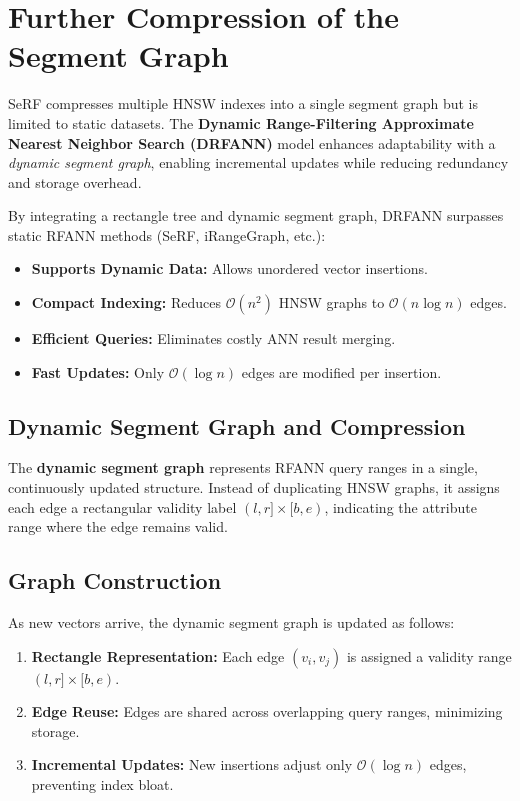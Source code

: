 \section{Further Compression of the Segment Graph}  
SeRF compresses multiple HNSW indexes into a single segment graph but is limited to static datasets. The \textbf{Dynamic Range-Filtering Approximate Nearest Neighbor Search (DRFANN)} model enhances adaptability with a \textit{dynamic segment graph}, enabling incremental updates while reducing redundancy and storage overhead.  

By integrating a rectangle tree and dynamic segment graph, DRFANN surpasses static RFANN methods (SeRF, iRangeGraph, etc.):  
\begin{itemize}  
    \item \textbf{Supports Dynamic Data:} Allows unordered vector insertions.  
    \item \textbf{Compact Indexing:} Reduces $\mathcal{O}(n^2)$ HNSW graphs to $\mathcal{O}(n \log n)$ edges.  
    \item \textbf{Efficient Queries:} Eliminates costly ANN result merging.  
    \item \textbf{Fast Updates:} Only $\mathcal{O}(\log n)$ edges are modified per insertion.  
\end{itemize}  

\subsection{Dynamic Segment Graph and Compression}  
The \textbf{dynamic segment graph} represents RFANN query ranges in a single, continuously updated structure. Instead of duplicating HNSW graphs, it assigns each edge a rectangular validity label $(l, r] \times [b, e)$, indicating the attribute range where the edge remains valid.  

\subsection{Graph Construction}  
As new vectors arrive, the dynamic segment graph is updated as follows:  
\begin{enumerate}  
    \item \textbf{Rectangle Representation:} Each edge $(v_i, v_j)$ is assigned a validity range $(l, r] \times [b, e)$.  
    \item \textbf{Edge Reuse:} Edges are shared across overlapping query ranges, minimizing storage.  
    \item \textbf{Incremental Updates:} New insertions adjust only $\mathcal{O}(\log n)$ edges, preventing index bloat.  
\end{enumerate}  




